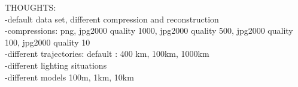 THOUGHTS:\\
-default data set, different compression and reconstruction\\
    -compressions: png, jpg2000 quality 1000, jpg2000 quality 500, jpg2000 quality 100, jpg2000 quality 10\\
-different trajectories: default : 400 km, 100km, 1000km\\
-different lighting situations\\
-different models 100m, 1km, 10km